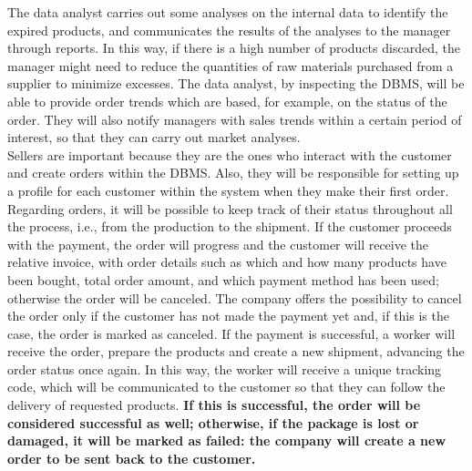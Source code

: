 The data analyst carries out some analyses on the internal data to identify the expired products, and communicates the results of the analyses to the manager through reports. In this way, if there is a high number of products discarded, the manager might need to reduce the quantities of raw materials purchased from a supplier to minimize excesses. The data analyst, by inspecting the DBMS, will be able to provide order trends which are based, for example, on the status of the order. They will also notify managers with sales trends within a certain period of interest, so that they can carry out market analyses.\\

Sellers are important because they are the ones who interact with the customer and create orders within the DBMS. Also, they will be responsible for setting up a profile for each customer within the system when they make their first order. Regarding orders, it will be possible to keep track of their status throughout all the process, i.e., from the production to the shipment. If the customer proceeds with the payment, the order will progress and the customer will receive the relative invoice, with order details such as which and how many products have been bought, total order amount, and which payment method has been used; otherwise the order will be canceled. The company offers the possibility to cancel the order only if the customer has not made the payment yet and, if this is the case, the order is marked as canceled. If the payment is successful, a worker will receive the order, prepare the products and create a new shipment, advancing the order status once again. In this way, the worker will receive a unique tracking code, which will be communicated to the customer so that they can follow the delivery of requested products. \textbf{If this is successful, the order will be considered successful as well; otherwise, if the package is lost or damaged, it will be marked as failed: the company will create a new order to be sent back to the customer.}\\

